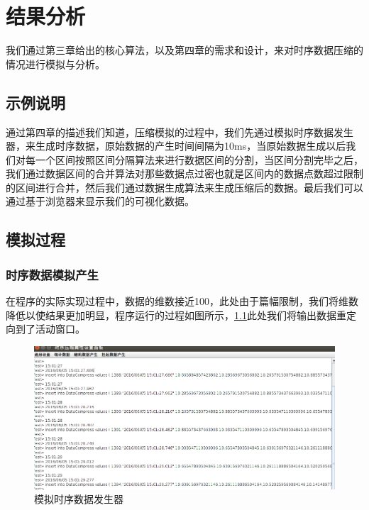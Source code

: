 
\chapter{结果分析}
\label{Chapter 5}

我们通过第三章给出的核心算法，以及第四章的需求和设计，来对时序数据压缩的情况进行模拟与分析。

\section{示例说明}
\label{5.1}
通过第四章的描述我们知道，压缩模拟的过程中，我们先通过模拟时序数据发生器，来生成时序数据，原始数据的产生时间间隔为10ms，当原始数据生成以后我们对每一个区间按照区间分隔算法来进行数据区间的分割，当区间分割完毕之后，我们通过数据区间的合并算法对那些数据点过密也就是区间内的数据点数超过限制的区间进行合并，然后我们通过数据生成算法来生成压缩后的数据。最后我们可以通过基于浏览器来显示我们的可视化数据。

\section{模拟过程}
\label{5.2}

\subsection{时序数据模拟产生}
\label{5.21}
在程序的实际实现过程中，数据的维数接近100，此处由于篇幅限制，我们将维数降低以使结果更加明显，程序运行的过程如图所示，\ref{Figure 5-1-1}此处我们将输出数据重定向到了活动窗口。

\begin{figure}[h!]
	\centering
	\includegraphics[scale=0.35]{./images/figure-5-1}
	\caption{模拟时序数据发生器}
	\label{Figure 5-1-1}
\end{figure}



